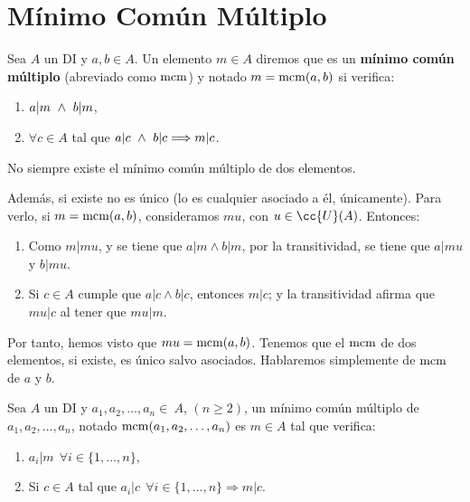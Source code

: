 \section{Mínimo Común Múltiplo}
\begin{definicion}
    Sea $A$ un DI y $a, b \in A$. Un elemento $m \in A$ diremos que es un \textbf{mínimo común múltiplo} (abreviado como $\operatorname{mcm}$) y notado $m = \operatorname{mcm}(a,b)$ si verifica:
    \begin{enumerate}
        \item $a|m \ \land \  b|m$,
        \item $\forall c \in A$ tal que $a|c \ \land \  b|c \Longrightarrow m|c$.
    \end{enumerate}
\end{definicion}

\begin{observacion}
    No siempre existe el mínimo común múltiplo de dos elementos.
    
    Además, si existe no es único (lo es cualquier asociado a él, únicamente). Para verlo, si $m = \operatorname{mcm}(a,b)$, consideramos $mu$, con $u\in \cc{U}(A)$. Entonces:
    \begin{enumerate}
        \item Como $m|mu$, y se tiene que $a|m\land b|m$, por la transitividad, se tiene que $a|mu$ y $b|mu$.
        \item Si $c\in A$ cumple que $a|c\land b|c$, entonces $m|c$; y la transitividad afirma que $mu|c$ al tener que $mu|m$.
    \end{enumerate}
\end{observacion}
Por tanto, hemos visto que $mu=\operatorname{mcm}(a,b)$. Tenemos que el $\operatorname{mcm}$ de dos elementos, si existe, es único salvo asociados. Hablaremos simplemente de $\operatorname{mcm}$ de $a$ y $b$.

\begin{definicion}
    Sea $A$ un DI y $a_1, a_2, \ldots, a_n \in~A$, $(n\geq 2)$, un mínimo común múltiplo de $a_1, a_2, \ldots, a_n$, notado
    $\operatorname{mcm}(a_1, a_2, \ldots, a_n)$ es $m \in A$ tal que verifica:
    \begin{enumerate}
        \item $a_i|m~~\forall i \in \{1, \ldots, n\}$,
        \item Si $c\in A$ tal que $a_i|c~~\forall i \in \{1, \ldots, n\} \Longrightarrow m|c$.    \end{enumerate}
\end{definicion}

